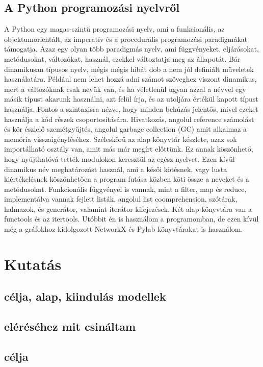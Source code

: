 \documentclass[
]{thesis-ekf}
\theoremstyle{definition}
\theoremstyle{remark}
\begin{document}
	\section{A Python programozási nyelvről}
	A Python egy magas-szintű programozási nyelv, ami a funkcionális, az objektumorientált, az imperatív és a procedurális programozási paradigmákat támogatja. Azaz egy olyan több paradigmás nyelv, ami függvényeket, eljárásokat, metódusokat, változókat, használ, ezekkel változtatja meg az állapotát. Bár dinamikusan típusos nyelv, mégis mégis hibát dob a nem jól definiált műveletek használatára. Például nem lehet hozzá adni számot szöveghez viszont dinamikus, mert a változóknak csak nevük van, és ha véletlenül ugyan azzal a névvel egy másik típust akarunk használni, azt felül írja, és az utoljára értékül kapott típust használja. Fontos a szintaxisra nézve, hogy minden behúzás jelentős, mivel ezeket használja a kód részek csoportosítására. Hivatkozás, angolul reference számolást és kör észlelő szemétgyűjtés, angolul garbage collection (GC) amit alkalmaz a memória visszaigényléséhez. Széleskörű az alap könyvtár készlete, azaz sok importálható osztály van, amit más már megírt előttünk. Ez annak köszönhető, hogy nyújthatóvá tették modulokon keresztül az egész nyelvet. Ezen kívül dinamikus név meghatározást használ, ami a késői kötésnek, vagy lusta kiértékelésnek köszönhetően a program futása közben köti össze a neveket és a metódusokat. Funkcionális függvényei is vannak, mint a filter, map és reduce, implementálva vannak fejlett listák, angolul list coomprehension, szótárak, halmazok, és generátor, valamint iterátor kifejezések. Két alap könyvtára van a functools és az itertools. Utóbbit én is használom a programomban, de ezen kívül még a gráfokhoz kidolgozott NetworkX és Pylab könyvtárakat is használom.
	
	\chapter{Kutatás}
	\section{célja, alap, kiindulás modellek}
	\section{eléréséhez mit csináltam}
	\section{célja}
	
\end{document}
